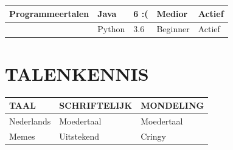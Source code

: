 \documentclass{article}
\begin{document}
\begin{tabularx}{\textwidth}{L{2cm}|X|L{2cm}|L{2cm}|L{2cm}}
\hline
{\bfseries Programmeertalen}						& Java								& 6 :(								& Medior 							& Actief \\
\hline
~													& Python							& 3.6								& Beginner							& Actief \\
\hline
\end{tabularx}

\section*{TALENKENNIS}

\begin{tabular}{l|l|l}
	\rowcolor{cegekagreen}
	{\bfseries \leavevmode\color{white} TAAL}	& {\bfseries \color{white} SCHRIFTELIJK}	& {\bfseries \color{white} MONDELING} \\
	\hline
	Nederlands									& Moedertaal								& Moedertaal \\
	\hline
	Memes										& Uitstekend								& Cringy \\
	\hline

\end{tabular}
\end{document}
